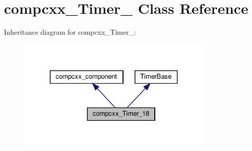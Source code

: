 \hypertarget{classcompcxx__Timer__18}{}\section{compcxx\+\_\+\+Timer\+\_ Class Reference}
\label{classcompcxx__Timer__18}


Inheritance diagram for compcxx\+\_\+\+Timer\+\_\+:\nopagebreak
\begin{figure}[H]
\begin{center}
\leavevmode
\includegraphics[width=272pt]{classcompcxx__Timer__18__inherit__graph}
\end{center}
\end{figure}


